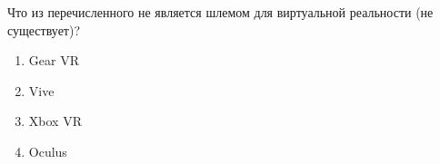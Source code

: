
Что из перечисленного не является шлемом для виртуальной реальности (не существует)?

\begin{enumerate}
    \item Gear VR
    \item Vive
    \item Xbox VR
    \item Oculus
\end{enumerate}

